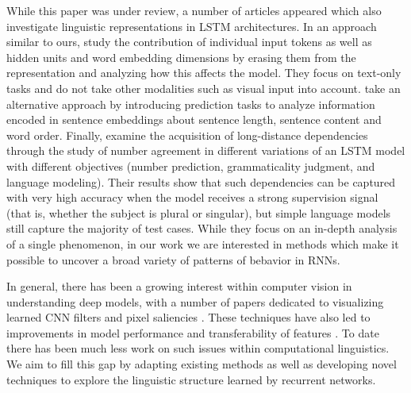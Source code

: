 While this paper was under review, a number of articles appeared which also
investigate linguistic representations in LSTM architectures. In an
approach similar to ours, \citep{li2016understanding} study the contribution of
individual input tokens as well as hidden units and word embedding dimensions
by erasing them from the representation and analyzing how this affects the model.
They focus on text-only tasks and do not take other 
modalities such as visual input into account.
\citep{adi2016fine} take an alternative approach by introducing prediction tasks
to analyze information encoded in sentence embeddings about sentence length,
sentence content and word order.
Finally, \citep{linzen2016assessing} examine
the acquisition of long-distance dependencies through the study of number agreement
in different variations of an LSTM model with different objectives (number prediction,
grammaticality judgment, and language modeling). Their results show that such dependencies
can be captured with very high accuracy when the model receives a strong supervision
signal (that is, whether the subject is plural or singular), but simple language models still capture
the majority of test cases. While they focus on an in-depth analysis of a single phenomenon, in our work
we are interested in methods which make it possible to uncover a broad variety of patterns of bebavior in RNNs.

In general, there has been a growing interest within computer vision
in understanding deep models, with a number of papers dedicated to
visualizing learned CNN filters and pixel saliencies
\cite{simonyan2013deep,yosinski2015understanding,mahendran2015understanding}. These
techniques have also led to improvements in model performance
\cite{eigen2013understanding} and transferability of features
\cite{zhou2014object}. To date there has been much less work on such
issues within computational linguistics. We aim to fill this gap by
adapting existing methods as well as developing novel techniques to
explore the linguistic structure learned by recurrent networks.

